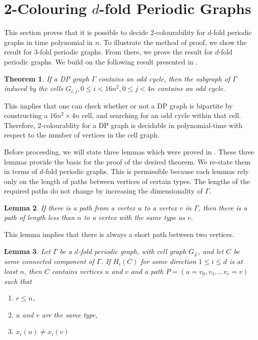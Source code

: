 \documentclass[letterpaper]{article}
\newtheorem{theorem}{Theorem}[section]
\newtheorem{lemma}[theorem]{Lemma}
\begin{document}
\section{2-Colouring $d$-fold Periodic Graphs}
This section proves that it is possible to decide 2-colourability for $d$-fold periodic graphs in time polynomial in $n$.
To illustrate the method of proof, we show the result for 3-fold periodic graphs.
From there, we prove the result for $d$-fold periodic graphs.
We build on the following result presented in \cite{bauslaugh05}.

\begin{theorem} \cite{bauslaugh05}
If a DP graph $\Gamma$ contains an odd cycle, then the subgraph of $\Gamma$ induced by the cells $G_{i,j}, 0 \leq i < 16n^2, 0 \leq j < 4n$ contains an odd cycle.
\end{theorem}

This implies that one can check whether or not a DP graph is bipartite by constructing a $16n^2 \times 4n$ cell, and searching for an odd cycle within that cell.
Therefore, 2-colourablity for a DP graph is decidable in polynomial-time with respect to the number of vertices in the cell graph.

Before proceeding, we will state three lemmas which were proved in \cite{bauslaugh05}.
These three lemmas provide the basis for the proof of the desired theorem.
We re-state them in terms of $d$-fold periodic graphs.
This is permissible because each lemmas rely only on the length of paths between vertices of certain types.
The lengths of the required paths do not change by increasing the dimensionality of $\Gamma$.

\begin{lemma}\cite{bauslaugh05}
If there is a path from a vertex $u$ to a vertex $v$ in $\Gamma$, then there is a path of length less than $n$ to a vertex with the same type as $v$.
\end{lemma}

This lemma implies that there is always a short path between two vertices. 

\begin{lemma} \cite{bauslaugh05}
Let $\Gamma$ be a $d$-fold periodic graph, with cell graph $G_{\vec{x}}$, and let $C$ be some connected component of $\Gamma$.
If $H_i(C)$ for some direction $1 \leq i \leq d$ is at least $n$, then $C$ contains vertices $u$ and $v$ and a path $P = (u = v_0, v_1, \ldots v_r = v)$ such that

\begin{enumerate}
    \item $r \leq n$,
    \item $u$ and $v$ are the same type,
    \item $x_i(u) \neq x_i(v)$ 
\end{enumerate}
\end{lemma}
\end{document}
